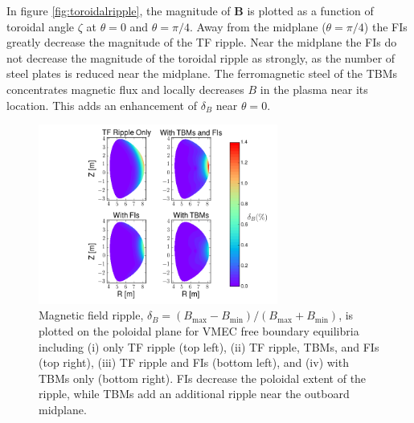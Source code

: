 \documentclass[aip, pop, preprint]{revtex4-1}
\numberwithin{figure}{section}
\numberwithin{equation}{section}
\begin{document}
In figure \ref{fig:toroidalripple}, the magnitude of $\bm{B}$ is plotted as a function of toroidal angle $\zeta$ at $\theta = 0$ and $\theta = \pi/4$. Away from the midplane ($\theta = \pi/4$) the FIs greatly decrease the magnitude of the TF ripple. Near the midplane the FIs do not decrease the magnitude of the toroidal ripple as strongly, as the number of steel plates is reduced near the midplane.\cite{Shinohara2009} The ferromagnetic steel of the TBMs concentrates magnetic flux and locally decreases $B$ in the plasma near its location. This adds an enhancement of $\delta_B$ near $\theta = 0$. 
\FloatBarrier

\begin{figure}[h!]
\centering
\includegraphics[width=0.7\textwidth]{ripplecontour.png}
\caption{\label{fig:ripplecontour} Magnetic field ripple, $\delta_B = (B_{\text{max}}-B_{\text{min}})/(B_{\text{max}} + B_{\text{min}})$, is plotted on the poloidal plane for VMEC free boundary equilibria including (i) only TF ripple (top left), (ii) TF ripple, TBMs, and FIs (top right), (iii) TF ripple and FIs (bottom left), and (iv) with TBMs only (bottom right). FIs decrease the poloidal extent of the ripple, while TBMs add an additional ripple near the outboard midplane.}
\end{figure}
\end{document}
